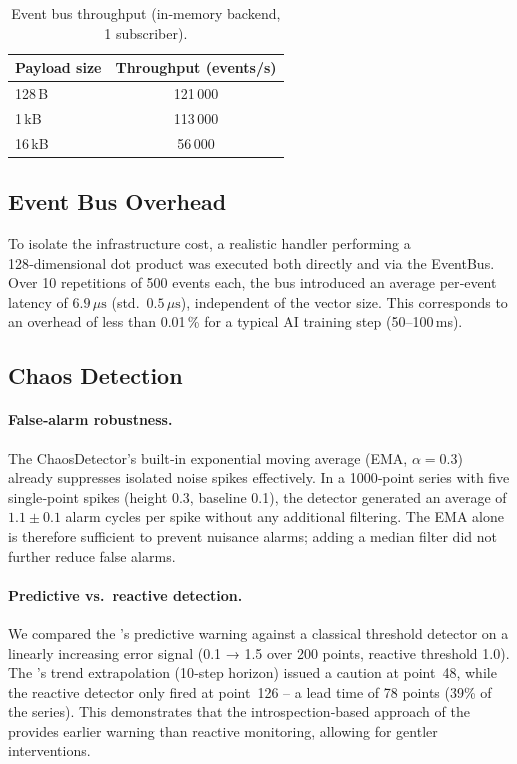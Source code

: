 \begin{table}[htbp]
\centering
\caption{Event bus throughput (in‑memory backend, 1 subscriber).}
\label{tab:throughput}
\begin{tabular}{l c}
\toprule
\textbf{Payload size} & \textbf{Throughput (events/s)} \\
\midrule
128\,B  & 121\,000 \\
1\,kB   & 113\,000 \\
16\,kB  & 56\,000  \\
\bottomrule
\end{tabular}
\end{table}

\subsection{Event Bus Overhead}

To isolate the infrastructure cost, a realistic handler performing a
128‑dimensional dot product was executed both directly and via the EventBus.
Over 10 repetitions of 500 events each, the bus introduced an average per‑event
latency of $6.9\,\mu\text{s}$ (std.\ $0.5\,\mu\text{s}$), independent of the
vector size.  This corresponds to an overhead of less than 0.01\,\% for a
typical AI training step (50--100\,ms).

\subsection{Chaos Detection}

\paragraph{False‑alarm robustness.}
The ChaosDetector’s built‑in exponential moving average (EMA, $\alpha=0.3$)
already suppresses isolated noise spikes effectively.  In a 1000‑point series
with five single‑point spikes (height 0.3, baseline 0.1), the detector
generated an average of $1.1 \pm 0.1$ alarm cycles per spike without any
additional filtering.  The EMA alone is therefore sufficient to prevent
nuisance alarms; adding a median filter did not further reduce false alarms.

\paragraph{Predictive vs.~reactive detection.}
We compared the \Core{}’s predictive warning against a classical threshold
detector on a linearly increasing error signal (0.1 → 1.5 over 200 points,
reactive threshold 1.0).  The \Core{}’s trend extrapolation (10‑step horizon)
issued a caution at point~48, while the reactive detector only fired at
point~126 – a lead time of 78 points (39\% of the series).  
This demonstrates that the introspection‑based approach of the \Core{}
provides earlier warning than reactive monitoring, allowing for gentler
interventions.


